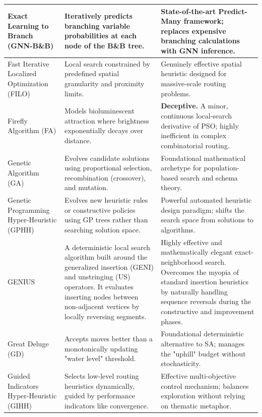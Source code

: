 \begin{center}
\begin{longtable}{
  >{\raggedright\arraybackslash}p{}
  >{\raggedright\arraybackslash}p{}
  >{\raggedright\arraybackslash}p{}
}
Exact Learning to Branch (GNN-B\&B) & Iteratively predicts branching variable probabilities at each node of the B\&B tree. & State-of-the-art Predict-Many framework; replaces expensive branching calculations with GNN inference. \\ \midrule

Fast Iterative Localized Optimization (FILO) & Local search constrained by predefined spatial granularity and proximity limits. & Genuinely effective spatial heuristic designed for massive-scale routing problems. \\ \midrule

Firefly Algorithm (FA) & Models bioluminescent attraction where brightness exponentially decays over distance. & \textbf{Deceptive.} A minor, continuous local-search derivative of PSO; highly inefficient in complex combinatorial routing. \\ \midrule

Genetic Algorithm (GA) & Evolves candidate solutions using proportional selection, recombination (crossover), and mutation. & Foundational mathematical archetype for population-based search and schema theory. \\ \midrule

Genetic Programming Hyper-Heuristic (GPHH) & Evolves new heuristic rules or constructive policies using GP trees rather than searching solution space. & Powerful automated heuristic design paradigm; shifts the search space from solutions to algorithms. \\ \midrule

GENIUS & A deterministic local search algorithm built around the generalized insertion (GENI) and unstringing (US) operators. It evaluates inserting nodes between non-adjacent vertices by locally reversing segments. & Highly effective and mathematically elegant exact-neighborhood search. Overcomes the myopia of standard insertion heuristics by naturally handling sequence reversals during the constructive and improvement phases. \\ \midrule

Great Deluge (GD) & Accepts moves better than a monotonically updating "water level" threshold. & Foundational deterministic alternative to SA; manages the "uphill" budget without stochasticity. \\ \midrule

Guided Indicators Hyper-Heuristic (GIHH) & Selects low-level routing heuristics dynamically, guided by performance indicators like convergence. & Effective multi-objective control mechanism; balances exploration without relying on thematic metaphor. \\ \midrule


\end{longtable}
\end{center}
